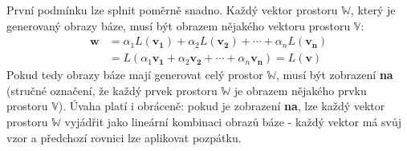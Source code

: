 \documentclass[a5paper,12pt]{amsbook}
\theoremstyle{definition}
\newcommand{\myscalar}[1]{#1}
\newcommand{\myvec}[1]{\mathbf{#1}}
\newcommand{\myspace}[1]{\mathbb{#1}}
\newcommand{\mymap}[1]{#1}
\begin{document}
První podmínku lze splnit poměrně snadno. Každý vektor prostoru $\myspace{W}$, který je
generovaný obrazy báze, musí být obrazem nějakého vektoru prostoru $\myspace{V}$:
\begin{equation*}
\begin{split}
\myvec{w}
  &= \myscalar{\alpha{}_1}\mymap{L}(\myvec{v_1}) + \myscalar{\alpha{}_2}\mymap{L}(\myvec{v_2})
      + \cdots + \myscalar{\alpha{}_n}\mymap{L}(\myvec{v_n}) \\
  &= \mymap{L}(\myscalar{\alpha{}_1}\myvec{v_1} + \myscalar{\alpha{}_2}\myvec{v_2} + \cdots 
      + \myscalar{\alpha{}_n}\myvec{v_n}) = \mymap{L}(\myvec{v})
\end{split}
\end{equation*}
Pokud tedy obrazy báze mají generovat celý prostor $\myspace{W}$, musí být zobrazení \textbf{na}
(stručné označení, že každý prvek prostoru $\myspace{W}$ je obrazem nějakého prvku prostoru
$\myspace{V}$). Úvaha platí i obráceně: pokud je zobrazení \textbf{na}, lze každý vektor
prostoru $\myspace{W}$ vyjádřit jako lineární kombinaci obrazů báze - každý vektor má
svůj vzor a předchozí rovnici lze aplikovat pozpátku.
\end{document}
